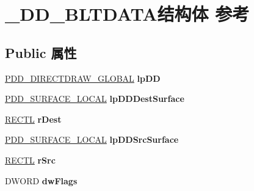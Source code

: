 \hypertarget{struct___d_d___b_l_t_d_a_t_a}{}\section{\+\_\+\+D\+D\+\_\+\+B\+L\+T\+D\+A\+T\+A结构体 参考}
\label{struct___d_d___b_l_t_d_a_t_a}
\subsection*{Public 属性}
\begin{DoxyCompactItemize}
\item 
\mbox{\label{struct___d_d___b_l_t_d_a_t_a_a98e16051714566513e0dca09e90215e6}} 
\hyperlink{struct___d_d___d_i_r_e_c_t_d_r_a_w___g_l_o_b_a_l}{P\+D\+D\+\_\+\+D\+I\+R\+E\+C\+T\+D\+R\+A\+W\+\_\+\+G\+L\+O\+B\+AL} {\bfseries lp\+DD}
\item 
\mbox{\label{struct___d_d___b_l_t_d_a_t_a_afd1b43605ce81c503fddbf01a1884dca}} 
\hyperlink{struct___d_d___s_u_r_f_a_c_e___l_o_c_a_l}{P\+D\+D\+\_\+\+S\+U\+R\+F\+A\+C\+E\+\_\+\+L\+O\+C\+AL} {\bfseries lp\+D\+D\+Dest\+Surface}
\item 
\mbox{\label{struct___d_d___b_l_t_d_a_t_a_a18465b1934f7c8e5109dac780f2d85fe}} 
\hyperlink{struct___r_e_c_t_l}{R\+E\+C\+TL} {\bfseries r\+Dest}
\item 
\mbox{\label{struct___d_d___b_l_t_d_a_t_a_a33d1e4d6e16dab59cf81a190e90700fa}} 
\hyperlink{struct___d_d___s_u_r_f_a_c_e___l_o_c_a_l}{P\+D\+D\+\_\+\+S\+U\+R\+F\+A\+C\+E\+\_\+\+L\+O\+C\+AL} {\bfseries lp\+D\+D\+Src\+Surface}
\item 
\mbox{\label{struct___d_d___b_l_t_d_a_t_a_a5336949c8dfd0a91a286e382cd3635eb}} 
\hyperlink{struct___r_e_c_t_l}{R\+E\+C\+TL} {\bfseries r\+Src}
\item 
\mbox{\label{struct___d_d___b_l_t_d_a_t_a_aba473383aca2a69925edb575947ed6f4}} 
D\+W\+O\+RD {\bfseries dw\+Flags}
\item 
\mbox{\label{struct___d_d___b_l_t_d_a_t_a_a89fe101eec3780f02364a5322a4d21a5}} 

\end{DoxyCompactItemize}
